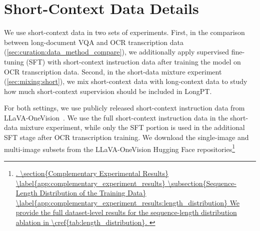 \documentclass{llmxive}
\begin{document}
{{{\section{Short-Context Data Details}
\label{app:short_context_data_details}
We use short-context data in two sets of experiments.
First, in the comparison between long-document VQA and OCR transcription data (\cref{sec:curation:data_method_compare}), we additionally apply supervised fine-tuning (SFT) with short-context instruction data after training the model on OCR transcription data.
Second, in the short-data mixture experiment (\cref{sec:mixing:short}), we mix short-context data with long-context data to study how much short-context supervision should be included in LongPT.

For both settings, we use publicly released short-context instruction data from LLaVA-OneVision~\citep{li2024llava}.
We use the full short-context instruction data in the short-data mixture experiment, while only the SFT portion is used in the additional SFT stage after OCR transcription training.
We download the single-image and multi-image subsets from the LLaVA-OneVision Hugging Face repositories\footnote{\url{.


\section{Complementary Experimental Results}
\label{app:complementary_experiment_results}

\subsection{Sequence-Length Distribution of the Training Data}
\label{app:complementary_experiment_results:length_distribution}
We provide the full dataset-level results for the sequence-length distribution ablation in \cref{tab:length_distribution}.

}}}}}
\end{document}
